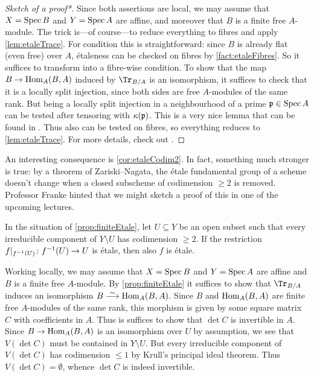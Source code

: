 \begin{proof}[Sketch of a proof\textup{*}]
	Since both assertions are local, we may assume that $X=\operatorname{Spec} B$ and $Y=\operatorname{Spec} A$ are affine, and moreover that $B$ is a finite free $A$-module. The trick is---of course---to reduce everything to fibres and apply \cref{lem:etaleTrace}. For condition  this is straightforward: since $B$ is already flat (even free) over $A$, étaleness can be checked on fibres by \cref{fact:etaleFibres}. So it suffices to transform  into a fibre-wise condition. To show that the map $B\morphism\Hom_A(B,A)$ induced by $\Tr_{B/A}$ is an isomorphism, it suffices to check that it is a locally split injection, since both sides are free $A$-modules of the same rank. But being a locally split injection in a neighbourhood of a prime $\mathfrak{p}\in\operatorname{Spec} A$ can be tested after tensoring with $\kappa(\mathfrak{p})$. This is a very nice lemma that can be found in \cite[Ch. (19.1.12)]{egaIV1}. Thus also  can be tested on fibres, so everything reduces to \cref{lem:etaleTrace}. For more details, check out \cite[Proposition~2.7.2]{jacobians}.
\end{proof}
An interesting consequence is \cref{cor:etaleCodim2}. In fact, something much stronger is true: by a theorem of Zariski--Nagata, the étale fundamental group of a scheme doesn't change when a closed subscheme of codimension $\geq2$ is removed. Professor Franke hinted that we might sketch a proof of this in one of the upcoming lectures.
\begin{cor}\label{cor:etaleCodim2}
	In the situation of \cref{prop:finiteEtale}, let $U\subseteq Y$ be an open subset such that every irreducible component of $Y\setminus U$ has codimension $\geq 2$. If the restriction $f|_{f^{-1}(U)}\colon f^{-1}(U)\morphism U$ is étale, then also $f$ is étale.
\end{cor}
\begin{proof*}
	Working locally, we may assume that $X=\operatorname{Spec} B$ and $Y=\operatorname{Spec} A$ are affine and $B$ is a finite free $A$-module. By \cref{prop:finiteEtale} it suffices to show that $\Tr_{B/A}$ induces an isomorphism $B\isomorphism \Hom_A(B,A)$. Since $B$ and $\operatorname{Hom}_A(B,A)$ are finite free $A$-modules of the same rank, this morphism is given by some square matrix $C$ with coefficients in $A$. Thus is suffices to show that $\det C$ is invertible in $A$. Since $B\morphism\Hom_A(B,A)$ is an isomorphism over $U$ by assumption, we see that $V(\det C)$ must be contained in $Y\setminus U$. But every irreducible component of $V(\det C)$ has codimension $\leq 1$ by Krull's principal ideal theorem. Thus $V(\det C)=\emptyset$, whence $\det C$ is indeed invertible.
\end{proof*}
